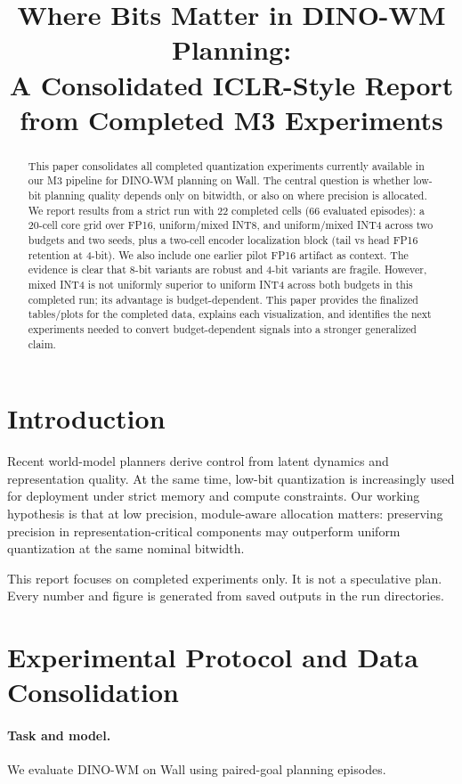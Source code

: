 \documentclass{article}
\title{Where Bits Matter in DINO-WM Planning:\\A Consolidated ICLR-Style Report from Completed M3 Experiments}
\author{}
\begin{document}
\maketitle
{}

\begin{abstract}
This paper consolidates all completed quantization experiments currently available in our M3 pipeline for DINO-WM planning on Wall.
The central question is whether low-bit planning quality depends only on bitwidth, or also on where precision is allocated.
We report results from a strict run with 22 completed cells (66 evaluated episodes): a 20-cell core grid over FP16, uniform/mixed INT8, and uniform/mixed INT4 across two budgets and two seeds, plus a two-cell encoder localization block (tail vs head FP16 retention at 4-bit).
We also include one earlier pilot FP16 artifact as context.
The evidence is clear that 8-bit variants are robust and 4-bit variants are fragile.
However, mixed INT4 is not uniformly superior to uniform INT4 across both budgets in this completed run; its advantage is budget-dependent.
This paper provides the finalized tables/plots for the completed data, explains each visualization, and identifies the next experiments needed to convert budget-dependent signals into a stronger generalized claim.
\end{abstract}

\section{Introduction}
Recent world-model planners derive control from latent dynamics and representation quality.
At the same time, low-bit quantization is increasingly used for deployment under strict memory and compute constraints.
Our working hypothesis is that at low precision, module-aware allocation matters: preserving precision in representation-critical components may outperform uniform quantization at the same nominal bitwidth.

This report focuses on completed experiments only.
It is not a speculative plan.
Every number and figure is generated from saved outputs in the run directories.

\section{Experimental Protocol and Data Consolidation}
\paragraph{Task and model.}
We evaluate DINO-WM on Wall using paired-goal planning episodes.
\end{document}
